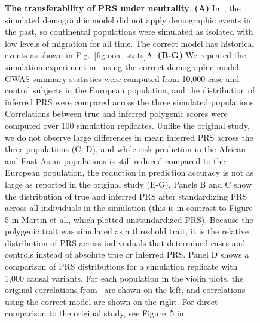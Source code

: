 \documentclass{article}
\begin{document}
\begin{figure}[ht]
\begin{center}
\caption{\textbf{The transferability of PRS under neutrality}.
    \textbf{(A)} In~\citet{martin2017human}, the simulated demographic model did not apply demographic
    events in the past, so continental populations were simulated as isolated with low levels of migration
    for all time. The correct model has historical events as shown in Fig.~\ref{fig:ooa_stats}A.
    \textbf{(B-G)} We repeated the simulation experiment in~\citet{martin2017human} using the correct
    demographic model.
    GWAS summary statistics were computed from 10,000 case and control subjects in the European
    population, and the distribution of inferred PRS were compared across the three simulated populations.
    Correlations between true and inferred polygenic scores were computed over 100 simulation replicates.
    Unlike the original study, we do not observe large differences in mean inferred PRS across
    the three populations (C, D), and while risk prediction in the African and East Asian populations is
    still reduced compared to the European population, the reduction in prediction accuracy is not as
    large as reported in the original study (E-G).
    Panels B and C show the distribution of true and inferred PRS after standardizing PRS across all individuals
    in the simulation (this is in contrast to Figure 5 in Martin et al., which plotted unstandardized PRS). Because
    the polygenic trait was simulated as a threshold trait, it is the relative distribution of PRS across indivuduals
    that determined cases and controls instead of absolute true or inferred PRS.
    Panel D shows a comparison of PRS distributions for a simulation replicate with 1,000 causal variants.
    For each population in the violin plots, the original correlations from~\citet{martin2017human}
    are shown on the left, and correlations using the correct model are shown on the right.
    For direct comparison to the original study, see Figure~5 in~\citet{martin2017human}.
}
\label{fig:prs}
\end{center}
\end{figure}
\end{document}
